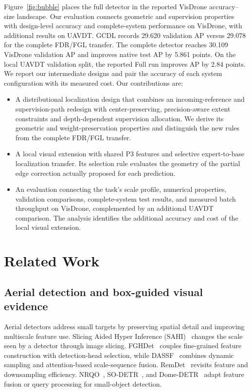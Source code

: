 Figure~\ref{fig:bubble} places the full detector in the reported VisDrone accuracy--size landscape. Our evaluation connects geometric and supervision properties with design-level accuracy and complete-system performance on VisDrone, with additional results on UAVDT. GCDL records 29.620 validation AP versus 29.078 for the complete FDR/FGL transfer. The complete detector reaches 30.109 VisDrone validation AP and improves native test AP by 5.861 points. On the local UAVDT validation split, the reported Full run improves AP by 2.84 points. We report our intermediate designs and pair the accuracy of each system configuration with its measured cost. Our contributions are:
\begin{itemize}
\item A distributional localization design that combines an incoming-reference and supervision-path redesign with center-preserving, precision-aware extent constraints and depth-dependent supervision allocation. We derive its geometric and weight-preservation properties and distinguish the new rules from the complete FDR/FGL transfer.
\item A local visual extension with shared P3 features and selective expert-to-base localization transfer. Its selection rule evaluates the geometry of the partial edge correction actually proposed for each prediction.
\item An evaluation connecting the task's scale profile, numerical properties, validation comparisons, complete-system test results, and measured batch throughput on VisDrone, complemented by an additional UAVDT comparison. The analysis identifies the additional accuracy and cost of the local visual extension.
\end{itemize}

\section{Related Work}
\subsection{Aerial detection and box-guided visual evidence}
Aerial detectors address small targets by preserving spatial detail and improving multiscale feature use. Slicing Aided Hyper Inference (SAHI)~\cite{akyon2022sahi} changes the scale seen by a detector through image slicing. FGHDet~\cite{bi2025fghdet} couples fine-grained feature construction with detection-head selection, while DASSF~\cite{li2025dassf} combines dynamic sampling and attention-based scale-sequence fusion. RemDet~\cite{li2025remdet} revisits feature and downsampling efficiency. NRQO~\cite{fang2025nrqo}, SO-DETR~\cite{zhang2025sodetr}, and Dome-DETR~\cite{hu2025domedetr} adapt feature fusion or query processing for small-object detection.

